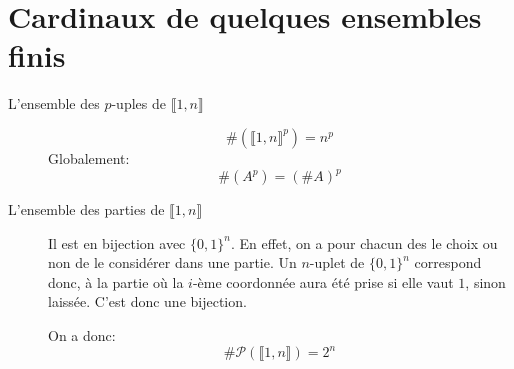 \section{Cardinaux de quelques ensembles finis}
  \begin{description}
    \item[L'ensemble des $p$-uples de $\llbracket 1,n \rrbracket$]
      \[
        \#(\llbracket 1,n \rrbracket ^p) = n^p
      \]
      Globalement:
      \[
        \#(A^p) = (\#A)^p
      \]

      \item[L'ensemble des parties de $\llbracket 1,n \rrbracket$]
      Il est en bijection avec $\{0,1\}^n$. En effet, on a pour chacun des
      le choix ou non de le considérer dans une partie. Un $n$-uplet
      de $\{0,1\}^n$ correspond donc, à la partie où la $i$-ème coordonnée aura
      été prise si elle vaut $1$, sinon laissée. C'est donc une bijection.


      On a donc: \[
        \#\mathcal{P}(\llbracket 1,n \rrbracket) = 2^n
      \]
  \end{description}
